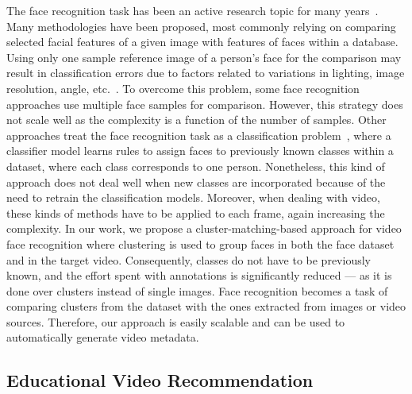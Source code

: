 The face recognition task has been an active research topic for many years~\cite{survey66}.
Many methodologies have been proposed, most commonly relying on comparing selected facial features of a given image with features of faces within a database.
Using only one sample reference image of a person's face for the comparison may result in classification errors due to factors related to variations in lighting, image resolution, angle, etc.~\cite{598229}.
To overcome this problem, some face recognition approaches use multiple face samples for comparison. However, this strategy does not scale well as the complexity is a function of the number of samples.
Other approaches treat the face recognition task as a classification problem~\cite{dadi2016improved, ghosal}, where a classifier model learns rules to assign faces to previously known classes within a dataset, where each class corresponds to one person.
Nonetheless, this kind of approach does not deal well when new classes are incorporated because of the need to retrain the classification models.
Moreover, when dealing with video, these kinds of methods have to be applied to each frame, again increasing the complexity.
In our work, we propose a cluster-matching-based approach for video face recognition where clustering is used to group faces in both the face dataset and in the target video.
Consequently, classes do not have to be previously known, and the effort spent with annotations is significantly reduced --- as it is done over clusters instead of single images.
Face recognition becomes a task of comparing clusters from the dataset with the ones extracted from images or video sources.
Therefore, our approach is easily scalable and can be used to automatically generate video metadata. 


\subsection{Educational Video Recommendation}

